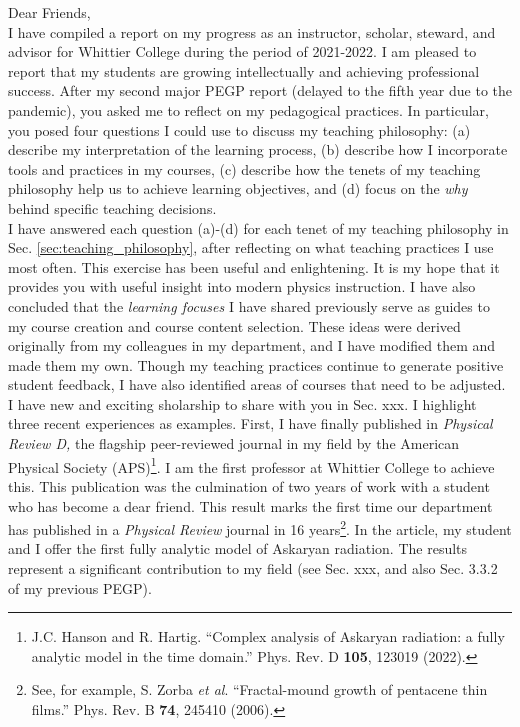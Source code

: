 \documentclass[../../main.tex]{subfiles}
\begin{document}
Dear Friends,
\\
\vspace{0.25cm}
I have compiled a report on my progress as an instructor, scholar, steward, and advisor for Whittier College during the period of 2021-2022.  I am pleased to report that my students are growing intellectually and achieving professional success.  After my second major PEGP report (delayed to the fifth year due to the pandemic), you asked me to reflect on my pedagogical practices.  In particular, you posed four questions I could use to discuss my teaching philosophy: (a) describe my interpretation of the learning process, (b) describe how I incorporate tools and practices in my courses, (c) describe how the tenets of my teaching philosophy help us to achieve learning objectives, and (d) focus on the \textit{why} behind specific teaching decisions.
\\
\vspace{0.25cm}
I have answered each question (a)-(d) for each tenet of my teaching philosophy in Sec. \ref{sec:teaching_philosophy}, after reflecting on what teaching practices I use most often.  This exercise has been useful and enlightening.  It is my hope that it provides you with useful insight into modern physics instruction.  I have also concluded that the \textit{learning focuses} I have shared previously serve as guides to my course creation and course content selection.  These ideas were derived originally from my colleagues in my department, and I have modified them and made them my own.  Though my teaching practices continue to generate positive student feedback, I have also identified areas of courses that need to be adjusted.
\\
\vspace{0.25cm}
I have new and exciting sholarship to share with you in Sec. xxx.  I highlight three recent experiences as examples.  First, I have finally published in \textit{Physical Review D,} the flagship peer-reviewed journal in my field by the American Physical Society (APS)\footnote{J.C. Hanson and R. Hartig. ``Complex analysis of Askaryan radiation: a fully analytic model in the time domain.'' Phys. Rev. D \textbf{105}, 123019 (2022).}.  I am the first professor at Whittier College to achieve this.  This publication was the culmination of two years of work with a student who has become a dear friend.  This result marks the first time our department has published in a \textit{Physical Review} journal in 16 years\footnote{See, for example, S. Zorba \textit{et al}. ``Fractal-mound growth of pentacene thin films.'' Phys. Rev. B \textbf{74}, 245410 (2006).}.  In the article, my student and I offer the first fully analytic model of Askaryan radiation.  The results represent a significant contribution to my field (see Sec. xxx, and also Sec. 3.3.2 of my previous PEGP).
\end{document}
